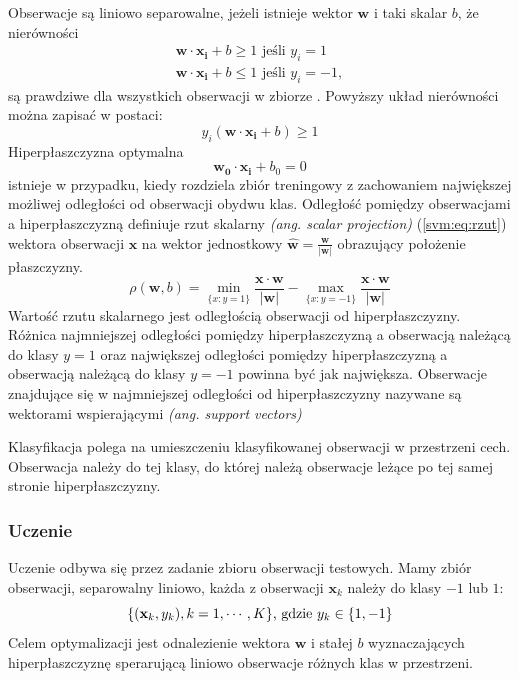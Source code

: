 \documentclass[a4paper,12pt,twoside,openany]{report}
\newcommand{\ang}[1]{\textit{(ang. #1)}}
\newcommand{\Eq}[1]{(\ref{#1})}
\renewcommand{\vec}[1]{\bm{#1}}
\begin{document}
Obserwacje są liniowo separowalne, jeżeli istnieje wektor $\bm{w}$ i taki skalar $b$, że nierówności
\begin{gather}
	\bm{w} \cdot \bm{x_i} + b \geq 1 \textrm{ jeśli } y_i = 1\\
	\bm{w} \cdot \bm{x_i} + b \leq 1 \textrm{ jeśli } y_i = -1,
\end{gather}
są prawdziwe dla wszystkich obserwacji w zbiorze \cite{Cortes1995}.
Powyższy układ nierówności można zapisać w postaci:
\begin{equation}
	y_i(\bm{w} \cdot \bm{x_i} + b) \geq 1
\end{equation}
Hiperpłaszczyzna optymalna 
\begin{equation}
	\bm{w_0} \cdot \bm{x_i}  + b_0 = 0
\end{equation}
istnieje w przypadku, kiedy rozdziela zbiór treningowy z zachowaniem największej możliwej odległości od obserwacji obydwu klas.
Odległość pomiędzy obserwacjami a hiperpłaszczyzną definiuje
rzut skalarny \ang{scalar projection} \Eq{svm:eq:rzut} wektora obserwacji $\bm{x}$ na wektor jednostkowy $\hat{\bm{w}} = \frac{\bm{w}}{|\bm{w}|}$
obrazujący położenie płaszczyzny.
\begin{equation}
	\rho(\bm{w}, b) = \min\limits_{\{x:y=1\}} \frac{\bm{x} \cdot \bm{w}} {|\bm{w}|} - \max\limits_{\{x:y=-1\}}  \frac{\bm{x} \cdot \bm{w}} {|\bm{w}|} 
	\label{svm:eq:rzut}
\end{equation}
Wartość rzutu skalarnego jest odległością obserwacji od hiperpłaszczyzny. 
Różnica najmniejszej odległości pomiędzy hiperpłaszczyzną a obserwacją należącą do klasy $y=1$
oraz największej odległości pomiędzy hiperpłaszczyzną a obserwacją należącą do klasy $y=-1$ 
powinna być jak największa.
Obserwacje znajdujące się w najmniejszej odległości od hiperpłaszczyzny nazywane są wektorami wspierającymi \ang{support vectors}

Klasyfikacja polega na umieszczeniu klasyfikowanej obserwacji w przestrzeni cech.
Obserwacja należy do tej klasy, do której należą obserwacje leżące po tej samej stronie hiperpłaszczyzny.
\subsubsection{Uczenie}
Uczenie odbywa się przez zadanie zbioru obserwacji testowych. 
Mamy zbiór obserwacji, separowalny liniowo, każda z obserwacji $\vec{x}_k$ należy do klasy $-1$ lub $1$:
\begin{equation}
	\{ ({\bf x}_k, y_k), k=1,\cdots,K \} \mbox{, gdzie } y_k \in \{1,-1\}
\end{equation}
Celem optymalizacji jest odnalezienie wektora $\vec{w}$ i stałej $b$ wyznaczających hiperpłaszczyznę
sperarującą liniowo obserwacje różnych klas w przestrzeni. 
\end{document}

